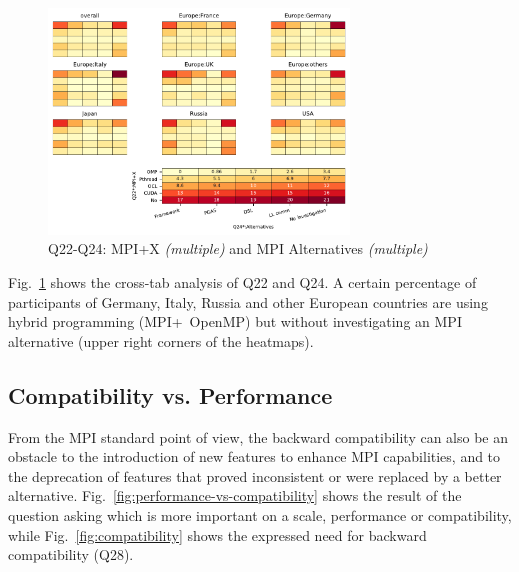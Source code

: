\documentclass[preprint,5p,times]{elsarticle}
\newcommand{\revision}[2]{{\color{blue}#2}}
\begin{document}
\begin{figure}[tb]
\begin{center}
\includegraphics[width=8.0cm]{Figs/Q22-Q24.pdf}
\vspace{-1.5mm}
\caption{Q22-Q24: MPI+X {\it(multiple)} and MPI Alternatives {\it(multiple)}}
\label{fig:mpi-x-and-alternatives}
\vspace{-3mm}%
\end{center}
\end{figure}

Fig.~\ref{fig:mpi-x-and-alternatives} shows the cross-tab analysis of Q22 and
Q24. A certain percentage of participants of Germany, Italy, Russia and other
European countries are using hybrid programming (MPI+\ OpenMP) but without
investigating \revision{the}{an} MPI alternative (upper right corners of the heatmaps).

\subsection{Compatibility vs. Performance}

\revision{In the history of MPI, portability, which translates into maintaining backward
compatibility across versions, has been of paramount importance. From the MPI
standard point of view it}{From the MPI
standard point of view, the backward compatibility} can also be an
obstacle to the introduction of new
features to enhance MPI capabilities, and to the deprecation of features that
proved inconsistent or were replaced by a better alternative.
Fig.~\ref{fig:performance-vs-compatibility} shows the result of the question
asking which is more important on a scale, performance or compatibility, while
Fig.~\ref{fig:compatibility} shows the expressed need for backward compatibility
(Q28).
\end{document}
